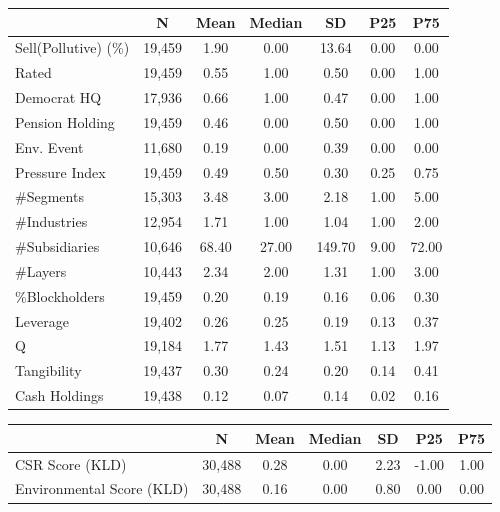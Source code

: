 {
\def\sym#1{\ifmmode^{#1}\else\(^{#1}\)\fi}
\begin{tabular}{l*{1}{cccccc}}
\toprule
                       &           N&        Mean&      Median&          SD&         P25&         P75\\
\midrule
Sell(Pollutive) (\%)   &      19,459&        1.90&        0.00&       13.64&        0.00&        0.00\\
Rated                  &      19,459&        0.55&        1.00&        0.50&        0.00&        1.00\\
Democrat HQ            &      17,936&        0.66&        1.00&        0.47&        0.00&        1.00\\
Pension Holding        &      19,459&        0.46&        0.00&        0.50&        0.00&        1.00\\
Env. Event             &      11,680&        0.19&        0.00&        0.39&        0.00&        0.00\\
Pressure Index         &      19,459&        0.49&        0.50&        0.30&        0.25&        0.75\\
\#Segments             &      15,303&        3.48&        3.00&        2.18&        1.00&        5.00\\
\#Industries           &      12,954&        1.71&        1.00&        1.04&        1.00&        2.00\\
\#Subsidiaries         &      10,646&       68.40&       27.00&      149.70&        9.00&       72.00\\
\#Layers               &      10,443&        2.34&        2.00&        1.31&        1.00&        3.00\\
\%Blockholders         &      19,459&        0.20&        0.19&        0.16&        0.06&        0.30\\
Leverage               &      19,402&        0.26&        0.25&        0.19&        0.13&        0.37\\
Q                      &      19,184&        1.77&        1.43&        1.51&        1.13&        1.97\\
Tangibility            &      19,437&        0.30&        0.24&        0.20&        0.14&        0.41\\
Cash Holdings          &      19,438&        0.12&        0.07&        0.14&        0.02&        0.16\\
\bottomrule
\end{tabular}
}
{
\def\sym#1{\ifmmode^{#1}\else\(^{#1}\)\fi}
\begin{tabular}{l*{1}{cccccc}}
\toprule
                       &           N&        Mean&      Median&          SD&         P25&         P75\\
\midrule
CSR Score (KLD)        &      30,488&        0.28&        0.00&        2.23&       -1.00&        1.00\\
Environmental Score (KLD)&      30,488&        0.16&        0.00&        0.80&        0.00&        0.00\\
\bottomrule
\end{tabular}
}
